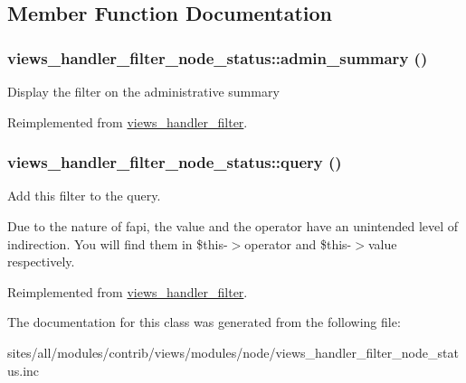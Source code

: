 \subsection{Member Function Documentation}
\hypertarget{classviews__handler__filter__node__status_fad09e6f2c94d8f6748b48c3ce137a25}{
\subsubsection[{admin\_\-summary}]{\setlength{\rightskip}{0pt plus 5cm}views\_\-handler\_\-filter\_\-node\_\-status::admin\_\-summary ()}}
\label{classviews__handler__filter__node__status_fad09e6f2c94d8f6748b48c3ce137a25}


Display the filter on the administrative summary 

Reimplemented from \hyperlink{classviews__handler__filter_655263cd0b73188eec064b9a9743fe4c}{views\_\-handler\_\-filter}.\hypertarget{classviews__handler__filter__node__status_4f5351bb3567b5fe8bca111ffca83690}{
\subsubsection[{query}]{\setlength{\rightskip}{0pt plus 5cm}views\_\-handler\_\-filter\_\-node\_\-status::query ()}}
\label{classviews__handler__filter__node__status_4f5351bb3567b5fe8bca111ffca83690}


Add this filter to the query.

Due to the nature of fapi, the value and the operator have an unintended level of indirection. You will find them in \$this-$>$operator and \$this-$>$value respectively. 

Reimplemented from \hyperlink{classviews__handler__filter_8e513b3abbc2559f37b550ca4957b4ae}{views\_\-handler\_\-filter}.

The documentation for this class was generated from the following file:\begin{CompactItemize}
\item 
sites/all/modules/contrib/views/modules/node/views\_\-handler\_\-filter\_\-node\_\-status.inc\end{CompactItemize}
